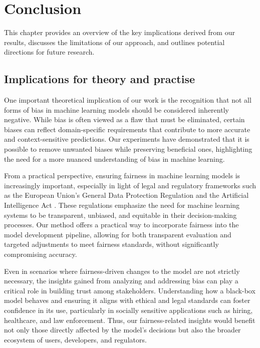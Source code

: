 %
\chapter{Conclusion}
This chapter provides an overview of the key implications derived from our results,  
discusses the limitations of our approach,  
and outlines potential directions for future research. 


\section{Implications for theory and practise}
One important theoretical implication of our work is the recognition that not all forms of bias
in machine learning models should be considered inherently negative.  
While bias is often viewed as a flaw that must be eliminated,
certain biases can reflect domain-specific requirements
that contribute to more accurate and context-sensitive predictions.  
Our experiments have demonstrated that it is possible to remove unwanted biases
while preserving beneficial ones, highlighting the need for a more nuanced understanding of bias in machine learning. 

From a practical perspective, ensuring fairness in machine learning models is increasingly important,
especially in light of legal and regulatory frameworks such as
the European Union's General Data Protection Regulation \cite{eugdpr} and the Artificial Intelligence Act \cite{aia}.  
These regulations emphasize the need for machine learning systems to be transparent,
unbiased, and equitable in their decision-making processes.  
Our method offers a practical way to incorporate fairness into the model development pipeline,
allowing for both transparent evaluation and targeted adjustments to meet fairness standards,
without significantly compromising accuracy.

Even in scenarios where fairness-driven changes to the model are not strictly necessary,
the insights gained from analyzing and addressing bias can play a critical role in building trust among stakeholders.  
Understanding how a black-box model behaves and ensuring it aligns
with ethical and legal standards can foster confidence in its use,
particularly in socially sensitive applications such as hiring, healthcare, and law enforcement.  
Thus, our fairness-related insights would benefit not only those directly affected by the model's decisions
but also the broader ecosystem of users, developers, and regulators.  


